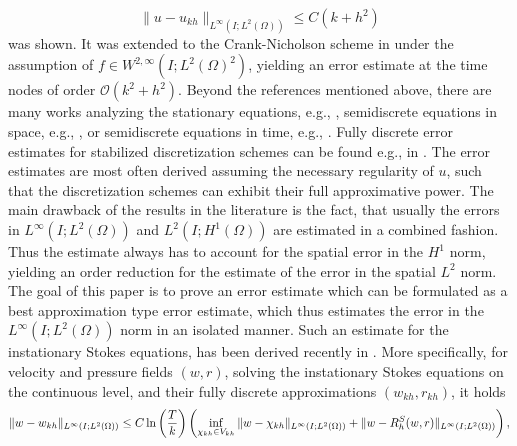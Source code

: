 \documentclass{m2an}
\newcommand\blue[1]{\textcolor{black}{#1}}
\newcommand{\Vkh}{V_{kh}}
\newcommand{\ukh}{u_{kh}}
\begin{document}
\begin{equation}\label{eq:errest_heywood}
  \|u - \ukh\|_{L^\infty(I;L^2(\Omega))} \le C ( k + h^2)
\end{equation}
was shown. It was extended to the Crank-Nicholson scheme in \cite{Heywood1990} under the 
assumption of $f \in W^{2,\infty}(I;L^2(\Omega)^2)$,
yielding an error estimate at the time nodes of order $\mathcal O(k^2+h^2)$.
Beyond the references mentioned above, there are many works analyzing the stationary equations,
  e.g., \cite{girault_finite_1986,schieweck_optimal_1996}, 
  semidiscrete equations in space, e.g., \cite{bernardi_conforming_1985, deckelnick_semidiscretization_2004},
  or semidiscrete equations in time, e.g., \cite{emmrich_error_2004, shen_error_1992,arndt_local_2015}.
  Fully discrete error estimates for stabilized discretization schemes can be found e.g., in
  \cite{ahmed_higherorder_2021,kirk_analysis_2022,de_frutos_error_2019,arndt_quasi_optimal_2016}.
  The error estimates are most often derived assuming the necessary regularity of $u$, such that the 
  discretization schemes can exhibit their full approximative power.
The main drawback of the results in the literature is the fact, that usually the errors in 
$L^\infty(I;L^2(\Omega))$ and $L^2(I;H^1(\Omega))$ are estimated 
in a combined fashion. Thus the estimate always has to account for the spatial error in the $H^1$ norm,
yielding an order reduction for the estimate of the error in the spatial $L^2$ norm.
The goal of this paper is to prove an error estimate which can be formulated as a best approximation
type error estimate, which thus estimates the error in the $L^\infty(I;L^2(\Omega))$ norm in an isolated manner.
Such an estimate for the instationary Stokes equations, has been derived 
recently in \cite{behringer_fully_2022}. More specifically, 
for velocity and pressure fields $(w,r)$, solving the instationary Stokes equations on the continuous level,
and their fully discrete approximations $(w_{kh},r_{kh})$, it holds
\begin{equation*}
  \|w - w_{kh}\|_{L^\infty(I;L^2(\Omega))} \le C 
  \ln \left(\frac{T}{k}\right) \left( \inf_{\blue{\chi_{kh}} \in \Vkh} 
    \|w - \blue{\chi_{kh}}\|_{L^\infty(I;L^2(\Omega))}
  + \|w- R^S_h(w,r)\|_{L^\infty(I;L^2(\Omega))}\right),
\end{equation*}
\end{document}
